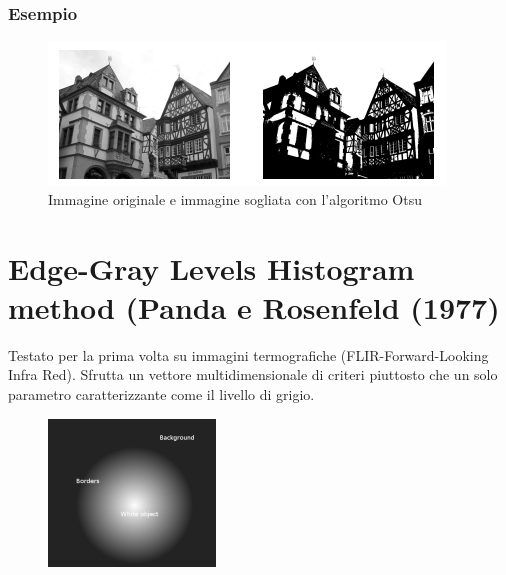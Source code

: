 \subsubsection*{Esempio}
\begin{figure}[H]
    \centering
    \includegraphics[width=\linewidth, keepaspectratio]{capitoli/immagini/imgs/otsu.png}
    \caption*{ Immagine originale e immagine sogliata con l'algoritmo Otsu}
\end{figure}

\section{Edge-Gray Levels Histogram method (Panda e Rosenfeld (1977)}
Testato per la prima volta su immagini termografiche (FLIR-Forward-Looking Infra Red). Sfrutta un vettore multidimensionale di criteri piuttosto che un solo parametro caratterizzante come il livello di grigio.

\begin{figure}[H]
    \centering
    \includegraphics[width=\linewidth, keepaspectratio]{capitoli/immagini/imgs/rosenfeld.png}
\end{figure}

